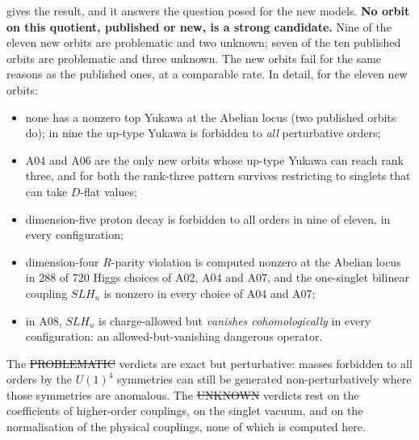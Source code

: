  gives the result, and it answers the question posed for the
new models. \textbf{No orbit on this quotient, published or new, is a strong
candidate.} Nine of the eleven new orbits are problematic and two unknown; seven
of the ten published orbits are problematic and three unknown. The new orbits
fail for the same reasons as the published ones, at a comparable rate. In
detail, for the eleven new orbits:
\begin{itemize}[leftmargin=*]
\item none has a nonzero top Yukawa at the Abelian locus (two published orbits
  do); in nine the up-type Yukawa is forbidden to \emph{all} perturbative orders;
\item A04 and A06 are the only new orbits whose up-type Yukawa can reach rank
  three, and for both the rank-three pattern survives restricting to singlets
  that can take $D$-flat values;
\item dimension-five proton decay is forbidden to all orders in nine of eleven,
  in every configuration;
\item dimension-four $R$-parity violation is computed nonzero at the Abelian
  locus in 288 of 720 Higgs choices of A02, A04 and A07, and the one-singlet
  bilinear coupling $SLH_u$ is nonzero in every choice of A04 and A07;
\item in A08, $SLH_u$ is charge-allowed but \emph{vanishes cohomologically} in
  every configuration: an allowed-but-vanishing dangerous operator.
\end{itemize}

The \st{PROBLEMATIC} verdicts are exact but perturbative: masses forbidden to all
orders by the $U(1)^4$ symmetries can still be generated non-perturbatively where
those symmetries are anomalous. The \st{UNKNOWN} verdicts rest on the
coefficients of higher-order couplings, on the singlet vacuum, and on the
normalisation of the physical couplings, none of which is computed here.
